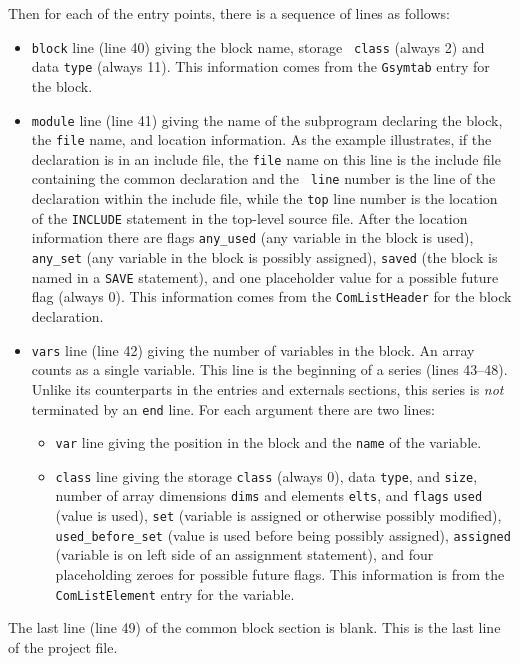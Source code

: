 \documentclass{article}
\begin{document}
Then for each of the entry points, there is a sequence of lines as
follows:
\begin{itemize}

  \item {\tt block} line (line 40) giving the block name, storage {\tt
	class} (always 2) and data {\tt type} (always 11).  This
	information comes from the {\tt Gsymtab} entry for the block.

  \item {\tt module} line (line 41) giving the name of the subprogram
	declaring the block, the {\tt file} name, and location
	information.  As the example illustrates, if the declaration
	is in an include file, the {\tt file} name on this line is the
	include file containing the common declaration and the {\tt
	line} number is the line of the declaration within the include
	file, while the {\tt top} line number is the location of the
	{\tt INCLUDE} statement in the top-level source file.  After
	the location information there are flags {\tt any\_used}
	(any variable in the block is used), {\tt any\_set} (any
	variable in the block is possibly assigned), {\tt saved} (the block is
	named in a {\tt SAVE} statement), and one placeholder value
	for a possible future flag (always 0).  This information comes
	from the {\tt ComListHeader} for the block declaration.

  \item {\tt vars} line (line 42) giving the number of variables in
	the block.  An array counts as a single variable.  This line
	is the beginning of a series (lines 43--48).  Unlike its
	counterparts in the entries and externals sections, this
	series is \emph{not} terminated by an {\tt end} line.  For
	each argument there are two lines:

  \begin{itemize}

	\item {\tt var} line giving the position in the block and the
            {\tt name} of the variable.

	\item {\tt class} line giving the storage {\tt class} (always
	    0), data {\tt type}, and {\tt size}, number of array
	    dimensions {\tt dims} and elements {\tt elts}, and
	    {\tt flags} {\tt used} (value is  used), {\tt set}
	    (variable is assigned or otherwise possibly modified),
	    {\tt  used\_before\_set} (value is used before being
	    possibly assigned), {\tt assigned} (variable
	    is on left side of an assignment statement), and four
	    placeholding zeroes for possible future flags.  This
	    information is from the {\tt ComListElement} entry
	    for the variable.

  \end{itemize}

\end{itemize}
The last line (line 49) of the common block section is blank.  This is
the last line of the project file.
\end{document}
